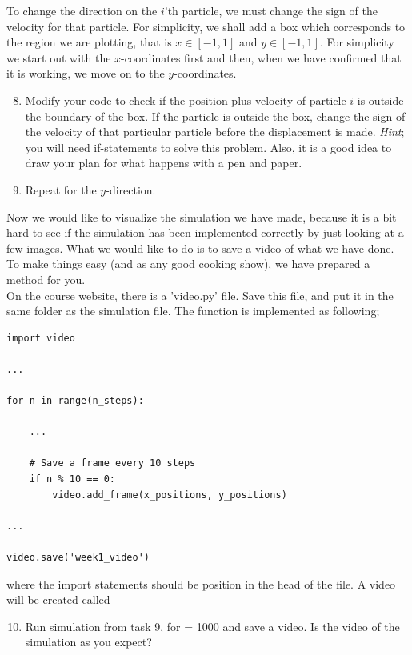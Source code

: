 \documentclass{article}
\begin{document}
To change the direction on the $i$'th particle, we must change
the sign of the velocity for that particle. For simplicity, we shall add a box
which corresponds to the region we are plotting, that is $x \in [-1,1]$ 
and $y \in [-1,1]$.
For simplicity we start out with the $x$-coordinates first and then, when we
have confirmed that it is working, we move on to the $y$-coordinates.

\begin{enumerate}
  \setcounter{enumi}{7}
  \item Modify your code to check if the position plus velocity of particle $i$
      is outside the boundary of the box.
      If the particle is outside the box, change the sign of the velocity of that
      particular particle before the displacement is made.
      {\em Hint}; you will need if-statements to solve this problem. Also, it
      is a good idea to draw your plan for what happens with a pen and paper.

  \item Repeat for the $y$-direction.

\end{enumerate}

\newpage

Now we would like to visualize the simulation we have made, because
it is a bit hard to see if the simulation has been implemented correctly by
just looking at a few images.
What we would like to do is to save a video of what we have done.
To make things easy (and as any good cooking show), we have prepared
a method for you. \\

On the course website, there is a 'video.py' file.
Save this file, and put it in the same folder as the simulation file.
The function is implemented as following;

\begin{lstlisting}
import video

...

for n in range(n_steps):

    ...

    # Save a frame every 10 steps
    if n % 10 == 0:
        video.add_frame(x_positions, y_positions)

...

video.save('week1_video')

\end{lstlisting}

where the import statements should be position in the head of the file.
A video will be created called 

\begin{enumerate}
  \setcounter{enumi}{9}
  \item Run simulation from task 9, for  = 1000 and save a video.
    Is the video of the simulation as you expect?

\end{enumerate}


\end{document}
